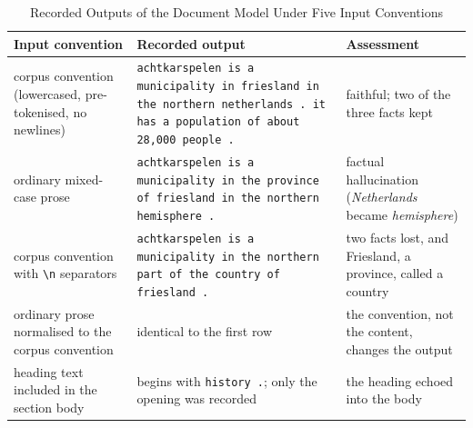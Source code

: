 \begin{table}[htbp]
	\centering
	\footnotesize
	\setlength{\tabcolsep}{4pt}
	\caption{Recorded Outputs of the Document Model Under Five Input Conventions}
	\label{tab:convention-outputs}
	\begin{tabular}{@{}P{3.2cm}P{5.3cm}P{3.4cm}@{}}
		\toprule
		\textbf{Input convention}                                   & \textbf{Recorded output}                                                                                                         & \textbf{Assessment}                                                 \\
		\midrule
		corpus convention (lowercased, pre-tokenised, no newlines)  & \texttt{achtkarspelen is a municipality in friesland in the northern netherlands . it has a population of about 28,000 people .} & faithful; two of the three facts kept                               \\
		\addlinespace
		ordinary mixed-case prose                                   & \texttt{achtkarspelen is a municipality in the province of friesland in the northern hemisphere .}                               & factual hallucination (\emph{Netherlands} became \emph{hemisphere}) \\
		\addlinespace
		corpus convention with \texttt{\textbackslash n} separators & \texttt{achtkarspelen is a municipality in the northern part of the country of friesland .}                                      & two facts lost, and Friesland, a province, called a country         \\
		\addlinespace
		ordinary prose normalised to the corpus convention          & identical to the first row                                                                                                       & the convention, not the content, changes the output                 \\
		\addlinespace
		heading text included in the section body                   & begins with \texttt{history .}; only the opening was recorded                                                                    & the heading echoed into the body                                    \\
		\bottomrule
	\end{tabular}
\end{table}
